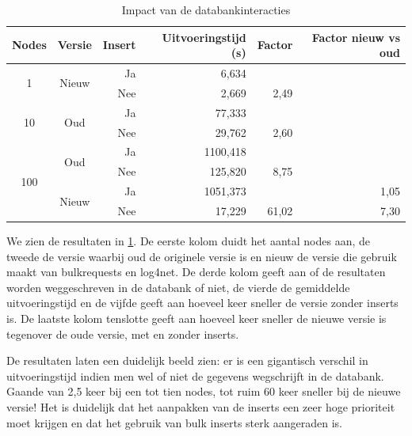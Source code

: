 \begin{table}[h]
\centering
\begin{tabular}{@{}ccrrrr@{}}
\toprule
\multicolumn{1}{l}{Nodes} & \multicolumn{1}{l}{Versie} & Insert & Uitvoeringstijd (s) & Factor & Factor nieuw vs oud \\ \midrule
\multirow{2}{*}{1}        & \multirow{2}{*}{Nieuw}     & Ja     & 6,634               &        &                     \\
                          &                            & Nee    & 2,669               & 2,49   &                     \\
\multirow{2}{*}{10}       & \multirow{2}{*}{Oud}       & Ja     & 77,333              &        &                     \\
                          &                            & Nee    & 29,762              & 2,60   &                     \\
\multirow{4}{*}{100}      & \multirow{2}{*}{Oud}       & Ja     & 1100,418            &        &                     \\
                          &                            & Nee    & 125,820             & 8,75   &                     \\
                          & \multirow{2}{*}{Nieuw}     & Ja     & 1051,373            &        & 1,05                \\
                          &                            & Nee    & 17,229              & 61,02  & 7,30                \\ \bottomrule
\end{tabular}
\caption{Impact van de databankinteracties}
\label{tabel-impact-db}
\end{table}

We zien de resultaten in \cref{tabel-impact-db}.
De eerste kolom duidt het aantal nodes aan, de tweede de versie waarbij oud de originele versie is en nieuw de versie die gebruik maakt van bulkrequests en log4net.
De derde kolom geeft aan of de resultaten worden weggeschreven in de databank of niet, de vierde de gemiddelde uitvoeringstijd en de vijfde geeft aan hoeveel keer
sneller de versie zonder inserts is.
De laatste kolom tenslotte geeft aan hoeveel keer sneller de nieuwe versie is tegenover de oude versie, met en zonder inserts.

De resultaten laten een duidelijk beeld zien:
er is een gigantisch verschil in uitvoeringstijd indien men wel of niet de gegevens wegschrijft in de databank.
Gaande van 2,5 keer bij een tot tien nodes, tot ruim 60 keer sneller bij de nieuwe versie!
Het is duidelijk dat het aanpakken van de inserts een zeer hoge prioriteit moet krijgen en dat het gebruik van bulk inserts sterk aangeraden is.

